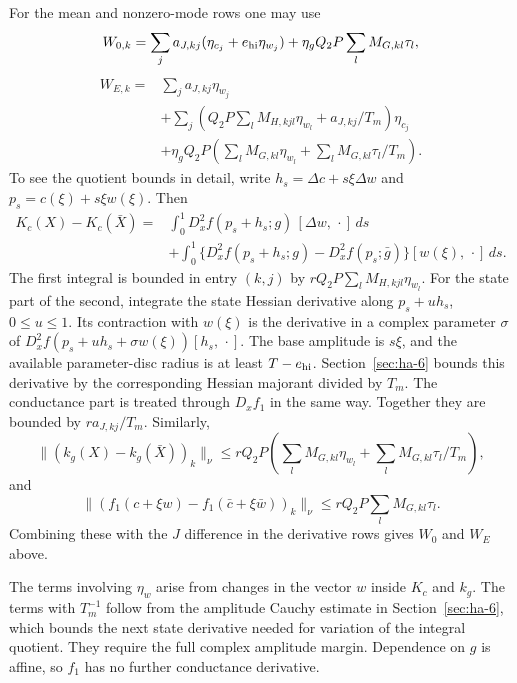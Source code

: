 \documentclass[11pt]{article}
\theoremstyle{definition}
\begin{document}
For the mean and nonzero-mode rows one may use
\[
 W_{0,k}=\sum_j a_{J,kj}
       (\eta_{c_j}+e_{\rm hi}\eta_{w_j})
       +\eta_g Q_2P\sum_l M_{G,kl}\tau_l,
\]
\[
 \begin{split}
 W_{E,k}={}&\sum_j a_{J,kj}\eta_{w_j}\\
 &+\sum_j\left(Q_2P\sum_lM_{H,kjl}\eta_{w_l}
                              +a_{J,kj}/T_m\right)\eta_{c_j}\\
 &+\eta_g Q_2P\left(\sum_lM_{G,kl}\eta_{w_l}
                         +\sum_lM_{G,kl}\tau_l/T_m\right).
 \end{split}
\]
To see the quotient bounds in detail, write
$h_s=\Delta c+s\xi\Delta w$ and $p_s=c(\xi)+s\xi w(\xi)$. Then
\[
 \begin{split}
 K_c(X)-K_c(\bar X)
 ={}&\int_0^1D_x^2f(p_s+h_s;g)\,[\Delta w,\,\cdot]\,ds\\
 &+\int_0^1\{D_x^2f(p_s+h_s;g)-D_x^2f(p_s;\bar g)\}
                                   [w(\xi),\,\cdot]\,ds .
 \end{split}
\]
The first integral is bounded in entry $(k,j)$ by
$rQ_2P\sum_lM_{H,kjl}\eta_{w_l}$.
For the state part of the second, integrate the state Hessian derivative along $p_s+u h_s$, $0\le u\le1$. Its contraction with $w(\xi)$ is the derivative in a complex parameter $\sigma$ of
$D_x^2f(p_s+u h_s+\sigma w(\xi))[h_s,\,\cdot]$.
The base amplitude is $s\xi$, and the available parameter-disc radius is at least $T-e_{\rm hi}$. Section~\ref{sec:ha-6} bounds this derivative by the corresponding Hessian majorant divided by $T_m$. The conductance part is treated through $D_xf_1$ in the same way. Together they are bounded by $r a_{J,kj}/T_m$. Similarly,
\[
 \|(k_g(X)-k_g(\bar X))_k\|_\nu
 \le rQ_2P\left(\sum_lM_{G,kl}\eta_{w_l}
                         +\sum_lM_{G,kl}\tau_l/T_m\right),
\]
and
\[
 \|(f_1(c+\xi w)-f_1(\bar c+\xi\bar w))_k\|_\nu
 \le rQ_2P\sum_lM_{G,kl}\tau_l.
\]
Combining these with the $J$ difference in the derivative rows gives $W_0$ and $W_E$ above.

The terms involving $\eta_w$ arise from changes in the vector $w$ inside $K_c$ and $k_g$. The terms with $T_m^{-1}$ follow from the amplitude Cauchy estimate in Section~\ref{sec:ha-6}, which bounds the next state derivative needed for variation of the integral quotient. They require the full complex amplitude margin. Dependence on $g$ is affine, so $f_1$ has no further conductance derivative.
\end{document}
